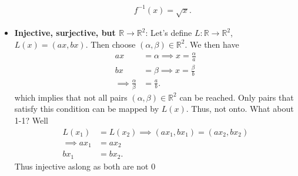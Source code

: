 \documentclass{report}
\begin{document}
\begin{itemize}
\begin{itemize}
\begin{align*}
                            f^{-1}(x) = \sqrt{x}
                        .\end{align*}
                \end{itemize}
            \item \textbf{Injective, surjective, but $\mathbb{R} \to \mathbb{R}^{2}$}: Let's define $L: \mathbb{R} \to \mathbb{R}^{2}$, $L(x) = (ax, bx)$. Then choose $(\alpha, \beta) \in \mathbb{R}^{2}$. We then have
                \begin{align*}
                    ax &= \alpha \implies x = \frac{\alpha}{a}\\
                    bx &= \beta \implies x = \frac{\beta}{b} \\
                    \implies \frac{\alpha}{\beta} &= \frac{a}{b}
                .\end{align*}
                which implies that not all pairs $(\alpha, \beta) \in \mathbb{R}^{2}$ can be reached. Only pairs that satisfy this condition can be mapped by $L(x)$. Thus, not onto.
                \bigbreak \noindent 
                What about 1-1? Well
                \begin{align*}
                    L(x_{1}) &= L(x_{2}) \implies (ax_{1}, bx_{1}) = (ax_{2}, bx_{2}) \\
                    \implies ax_{1} &= ax_{2} \\
                    bx_{1} &= bx_{2}
                .\end{align*}
                Thus injective aslong as both are not $0$


\end{itemize}
\end{document}
